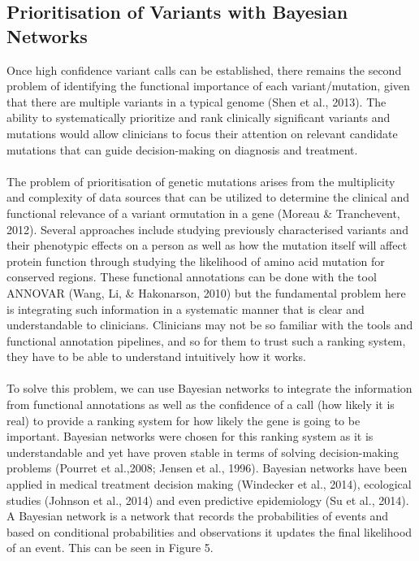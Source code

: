 \documentclass{article}
\begin{document}
\subsection{Prioritisation of Variants with Bayesian Networks }
Once high confidence variant calls can be established, there remains the second problem of identifying the functional importance of each variant/mutation, given that there are multiple variants in a typical genome (Shen et al., 2013). The ability to systematically prioritize and rank clinically significant variants and mutations would allow clinicians to focus their attention on relevant candidate mutations that can guide decision-making on diagnosis and treatment.\\\\ The problem of prioritisation of genetic mutations arises from the multiplicity and complexity of data sources that can be utilized to determine the clinical and functional relevance of a variant ormutation in a gene (Moreau \& Tranchevent, 2012). Several approaches include studying previously characterised variants and their phenotypic effects on a person as well as how the mutation itself will affect protein function through studying the likelihood of amino acid mutation for conserved regions. These functional annotations can be done with the tool ANNOVAR (Wang, Li, \& Hakonarson, 2010) but the fundamental problem here is integrating such information in a systematic manner that is clear and understandable to clinicians. Clinicians may not be so familiar with the tools and functional annotation pipelines, and so for them to trust such a ranking system, they have to be able to understand intuitively how it works. \\\\ To solve this problem, we can use Bayesian networks to integrate the information from functional annotations as well as the confidence of a call (how likely it is real) to provide a ranking system for how likely the gene is going to be important. Bayesian networks were chosen for this ranking system as it is understandable and yet have proven stable in terms of solving decision-making problems (Pourret et al.,2008; Jensen et al., 1996). Bayesian networks have been applied in medical treatment decision making (Windecker et al., 2014), ecological studies (Johnson et al., 2014) and even predictive epidemiology (Su et al., 2014). A Bayesian network is a network that records the probabilities of events and based on conditional probabilities and observations it updates the final likelihood of an event. This can be seen in Figure 5.
\end{document}
